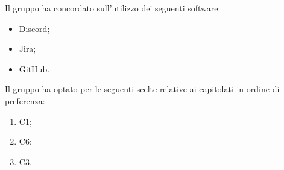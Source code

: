 Il gruppo \Gruppo{} ha concordato sull'utilizzo dei seguenti software:
\begin{itemize}
\item Discord;
\item Jira;
\item GitHub.
\end{itemize}

Il gruppo ha optato per le seguenti scelte relative ai capitolati in ordine di preferenza:
\begin{enumerate}
\item C1;
\item C6;
\item C3.
\end{enumerate}